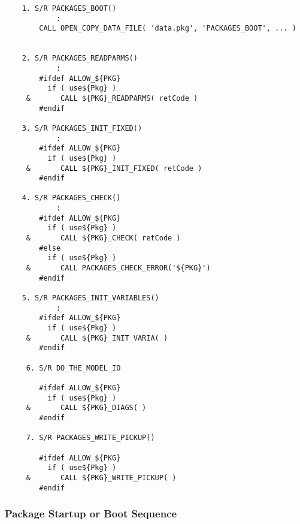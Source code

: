 {\footnotesize
\begin{verbatim}
    1. S/R PACKAGES_BOOT()
            :
        CALL OPEN_COPY_DATA_FILE( 'data.pkg', 'PACKAGES_BOOT', ... )
 

    2. S/R PACKAGES_READPARMS()
            :
        #ifdef ALLOW_${PKG}
          if ( use${Pkg} )
     &       CALL ${PKG}_READPARMS( retCode )
        #endif

    3. S/R PACKAGES_INIT_FIXED()
            :
        #ifdef ALLOW_${PKG}
          if ( use${Pkg} )
     &       CALL ${PKG}_INIT_FIXED( retCode )
        #endif

    4. S/R PACKAGES_CHECK()
            :
        #ifdef ALLOW_${PKG}
          if ( use${Pkg} )
     &       CALL ${PKG}_CHECK( retCode )
        #else
          if ( use${Pkg} )
     &       CALL PACKAGES_CHECK_ERROR('${PKG}')
        #endif

    5. S/R PACKAGES_INIT_VARIABLES()
            :
        #ifdef ALLOW_${PKG}
          if ( use${Pkg} )
     &       CALL ${PKG}_INIT_VARIA( )
        #endif

     6. S/R DO_THE_MODEL_IO

        #ifdef ALLOW_${PKG}
          if ( use${Pkg} )
     &       CALL ${PKG}_DIAGS( )
        #endif

     7. S/R PACKAGES_WRITE_PICKUP()

        #ifdef ALLOW_${PKG}
          if ( use${Pkg} )
     &       CALL ${PKG}_WRITE_PICKUP( )
        #endif\end{verbatim}
}


\subsubsection{Package Startup or Boot Sequence}

